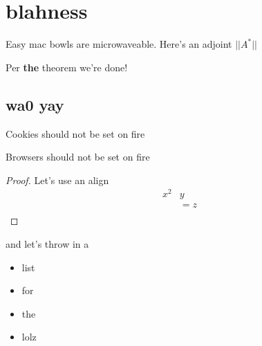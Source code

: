 \section{blahness}

\begin{theorem}
    Easy mac bowls are microwaveable. Here's an adjoint $||A^*||$
\end{theorem}

Per \textbf{the} theorem we're done!

\subsection{wa0 yay}

\begin{lemma}
    Cookies should not be set on fire
\end{lemma}

\begin{corollary}
    Browsers should not be set on fire
\end{corollary}

\begin{proof}
    Let's use an align
    \begin{align}
        x^2 &  y \\
        & = z \\
    \end{align}
\end{proof}

and let's throw in a 
\begin{itemize}
    \item list
    \item for 
    \item the 
    \item lolz
\end{itemize}








